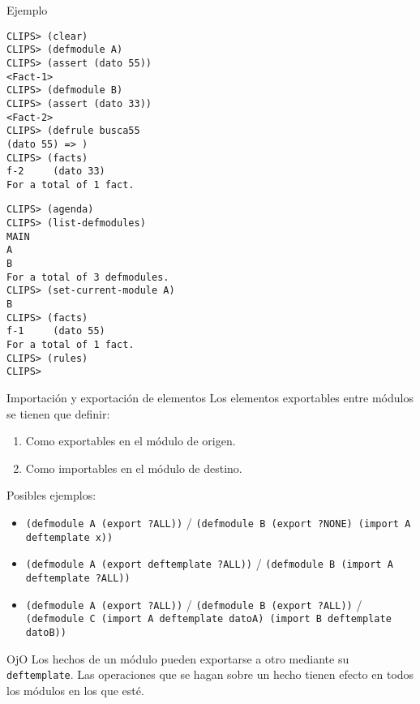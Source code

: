 \documentclass[usenames,dvipsnames,aspectratio=169]{beamer}
\begin{document}
\begin{frame}[fragile]{Ejemplo}
	\small
	\begin{minipage}[t]{0.47\textwidth}
		\begin{verbatim}
CLIPS> (clear)
CLIPS> (defmodule A)
CLIPS> (assert (dato 55))
<Fact-1>
CLIPS> (defmodule B)
CLIPS> (assert (dato 33))
<Fact-2>
CLIPS> (defrule busca55
(dato 55) => )
CLIPS> (facts)
f-2     (dato 33)
For a total of 1 fact.
		\end{verbatim}
	\end{minipage}
	\hfill
	\begin{minipage}[t]{0.47\textwidth}
		\begin{verbatim}
CLIPS> (agenda)
CLIPS> (list-defmodules)
MAIN
A
B
For a total of 3 defmodules.
CLIPS> (set-current-module A)
B
CLIPS> (facts)
f-1     (dato 55)
For a total of 1 fact.
CLIPS> (rules)
CLIPS> 
		\end{verbatim}
	\end{minipage}
\end{frame}

\begin{frame}{Importación y exportación de elementos}
	Los elementos exportables entre módulos se tienen que definir:
	\begin{enumerate}\small
		\item Como exportables en el módulo de origen.
		\item Como importables en el módulo de destino.
	\end{enumerate}
	Posibles ejemplos:
	\begin{itemize}\footnotesize
		\item \texttt{(defmodule A (export ?ALL))} / \texttt{(defmodule B (export ?NONE) (import A deftemplate x))}
		\item \texttt{(defmodule A (export deftemplate ?ALL))} / \texttt{(defmodule B (import A deftemplate ?ALL))}
		\item \texttt{(defmodule A (export ?ALL))} / \texttt{(defmodule B (export ?ALL))} / \texttt{(defmodule C (import A deftemplate datoA) (import B deftemplate datoB))}
	\end{itemize}
	\begin{block}{OjO}
		Los hechos de un módulo pueden exportarse a otro mediante su \texttt{deftemplate}. Las operaciones que se hagan sobre un hecho tienen efecto en todos los módulos en los que esté.
	\end{block}
\end{frame}
\end{document}
